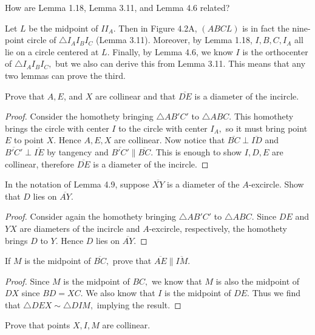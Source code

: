 \documentclass[letterpaper,oneside]{scrartcl}
\providecommand{\ol}{\overline}
\begin{document}
\begin{problem*}
  [4.7]
  How are Lemma 1.18, Lemma 3.11, and Lemma 4.6 related?
\end{problem*}
Let $L$ be the midpoint of $II_A.$ Then in Figure 4.2A, $(ABCL)$ is in fact the nine-point circle of $\triangle I_AI_BI_C$ (Lemma 3.11). Moreover, by Lemma 1.18, $I,B,C,I_A$ all lie on a circle centered at $L.$ Finally, by Lemma 4.6, we know $I$ is the orthocenter of $\triangle I_AI_BI_C,$ but we also can derive this from Lemma 3.11. This means that any two lemmas can prove the third.
\begin{problem*}
  [4.8]
  Prove that $A, E$, and $X$ are collinear and that $\ol{DE}$ is a diameter of the incircle. 
\end{problem*}
\begin{proof}
  Consider the homothety bringing $\triangle AB'C'$ to $\triangle ABC.$ This homothety brings the circle with center $I$ to the circle with center $I_A,$ so it must bring point $E$ to point $X.$ Hence $A,E,X$ are collinear. Now notice that $\ol{BC} \perp \ol{ID}$ and $\ol{B'C'} \perp \ol{IE}$ by tangency and $\ol{B'C'} \parallel \ol{BC}.$ This is enough to show $I,D,E$ are collinear, therefore $\ol{DE}$ is a diameter of the incircle. 
\end{proof}
\begin{lemma*}
  In the notation of Lemma 4.9, suppose $\ol{XY}$ is a diameter of the $A$-excircle. Show that $D$ lies on $\ol{AY}.$
\end{lemma*}
\begin{proof}
  Consider again the homothety bringing $\triangle AB'C'$ to $\triangle ABC.$ Since $DE$ and $YX$ are diameters of the incircle and $A$-excircle, respectively, the homothety brings $D$ to $Y.$ Hence $D$ lies on $\ol{AY}.$
\end{proof}
\begin{problem*}
  [4.11]
  If $M$ is the midpoint of $\ol{BC},$ prove that $\ol{AE} \parallel \ol{IM}.$
\end{problem*}
\begin{proof}
  Since $M$ is the midpoint of $BC,$ we know that $M$ is also the midpoint of $DX$ since $BD=XC.$ We also know that $I$ is the midpoint of $DE.$ Thus we find that $\triangle DEX \sim \triangle DIM,$ implying the result. 
\end{proof}
\begin{problem*}
  [4.12]
  Prove that points $X,I,M$ are collinear.
\end{problem*}
\end{document}
